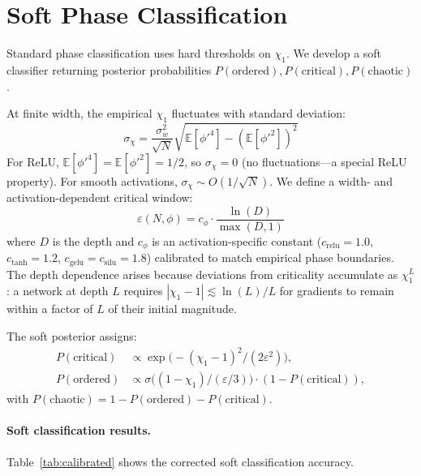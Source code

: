\documentclass[10pt]{article}
\newcommand{\EE}{\mathbb{E}}
\begin{document}
\section{Soft Phase Classification}
\label{sec:calibrated}

Standard phase classification uses hard thresholds on $\chi_1$.
We develop a soft classifier returning posterior probabilities $P(\text{ordered}), P(\text{critical}), P(\text{chaotic})$.

At finite width, the empirical $\chi_1$ fluctuates with standard deviation:
\begin{equation}
    \sigma_\chi = \frac{\sigma_w^2}{\sqrt{N}}\sqrt{\EE[\phi'^4] - (\EE[\phi'^2])^2}
    \label{eq:chi1-fluctuation}
\end{equation}
For ReLU, $\EE[\phi'^4] = \EE[\phi'^2] = 1/2$, so $\sigma_\chi = 0$ (no fluctuations---a special ReLU property).
For smooth activations, $\sigma_\chi \sim O(1/\sqrt{N})$.
We define a width- and activation-dependent critical window:
\begin{equation}
    \varepsilon(N, \phi) = c_\phi \cdot \frac{\ln(D)}{\max(D,1)}
    \label{eq:critical-window}
\end{equation}
where $D$ is the depth and $c_\phi$ is an activation-specific constant ($c_{\text{relu}} = 1.0$, $c_{\text{tanh}} = 1.2$, $c_{\text{gelu}} = c_{\text{silu}} = 1.8$) calibrated to match empirical phase boundaries.
The depth dependence arises because deviations from criticality accumulate as $\chi_1^L$: a network at depth $L$ requires $|\chi_1 - 1| \lesssim \ln(L)/L$ for gradients to remain within a factor of $L$ of their initial magnitude.

The soft posterior assigns:
\begin{align}
    P(\text{critical}) &\propto \exp\!\bigl(-(\chi_1 - 1)^2/(2\varepsilon^2)\bigr), \label{eq:p-critical} \\
    P(\text{ordered}) &\propto \sigma\!\bigl((1 - \chi_1)/(\varepsilon/3)\bigr) \cdot (1 - P(\text{critical})), \label{eq:p-ordered}
\end{align}
with $P(\text{chaotic}) = 1 - P(\text{ordered}) - P(\text{critical})$.

\paragraph{Soft classification results.}
Table~\ref{tab:calibrated} shows the corrected soft classification accuracy.
\end{document}
